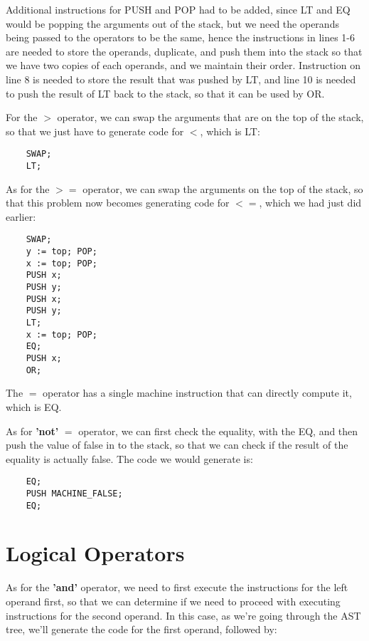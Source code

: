 \documentclass{article}
\begin{document}
Additional instructions for PUSH and POP had to be added, since LT and EQ would be popping the arguments out of the stack, but we need the operands being passed to the operators to be the same, hence the instructions in lines 1-6 are needed to store the operands, duplicate, and push them into the stack so that we have two copies of each operands, and we maintain their order. Instruction on line 8 is needed to store the result that was pushed by LT, and line 10 is needed to push the result of LT back to the stack, so that it can be used by OR.

For the $>$ operator, we can swap the arguments that are on the top of the stack, so that we just have to generate code for $<$, which is LT:

\begin{lstlisting}
    SWAP;
    LT;
\end{lstlisting}

As for the $>=$ operator, we can swap the arguments on the top of the stack, so that this problem now becomes generating code for $<=$, which we had just did earlier:

\begin{lstlisting}
    SWAP;
    y := top; POP;
    x := top; POP;
    PUSH x;
    PUSH y;
    PUSH x;
    PUSH y;
    LT;
    x := top; POP;
    EQ;
    PUSH x;
    OR;
\end{lstlisting}

The $=$ operator has a single machine instruction that can directly compute it, which is EQ.

As for \textbf{'not'} $=$ operator, we can first check the equality, with the EQ, and then push the value of false in to the stack, so that we can check if the result of the equality is actually false. The code we would generate is:

\begin{lstlisting}
    EQ;
    PUSH MACHINE_FALSE;
    EQ;
\end{lstlisting}

\section{Logical Operators}

As for the \textbf{'and'} operator, we need to first execute the instructions for the left operand first, so that we can determine if we need to proceed with executing instructions for the second operand. In this case, as we're going through the AST tree, we'll generate the code for the first operand, followed by:
\end{document}
